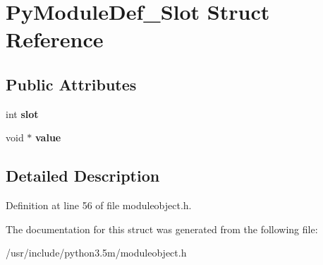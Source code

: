 \hypertarget{structPyModuleDef__Slot}{}\section{Py\+Module\+Def\+\_\+\+Slot Struct Reference}
\label{structPyModuleDef__Slot}
\subsection*{Public Attributes}
\begin{DoxyCompactItemize}
\item 
int {\bfseries slot}\hypertarget{structPyModuleDef__Slot_a6029cf64d307705f7f8b340c2311e0cb}{}\label{structPyModuleDef__Slot_a6029cf64d307705f7f8b340c2311e0cb}

\item 
void $\ast$ {\bfseries value}\hypertarget{structPyModuleDef__Slot_a9683b7708513dc530b8761f43aeeabfe}{}\label{structPyModuleDef__Slot_a9683b7708513dc530b8761f43aeeabfe}

\end{DoxyCompactItemize}


\subsection{Detailed Description}


Definition at line 56 of file moduleobject.\+h.



The documentation for this struct was generated from the following file\+:\begin{DoxyCompactItemize}
\item 
/usr/include/python3.\+5m/moduleobject.\+h\end{DoxyCompactItemize}
